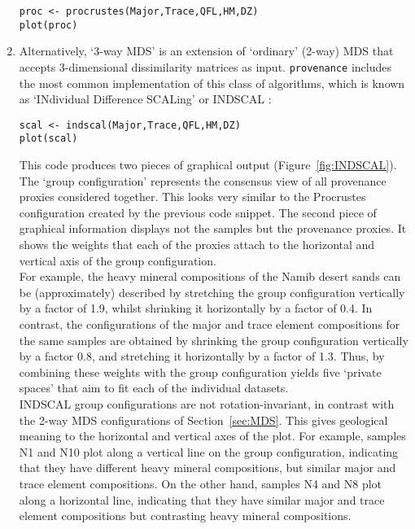 \documentclass[11pt]{article}
\begin{document}
\begin{enumerate}
\begin{verbatim}
proc <- procrustes(Major,Trace,QFL,HM,DZ)
plot(proc)
\end{verbatim}

\item Alternatively, `3-way MDS' is an extension of `ordinary' (2-way)
  MDS that accepts 3-dimensional dissimilarity matrices as
  input. \texttt{provenance} includes the most common implementation
  of this class of algorithms, which is known as `INdividual
  Difference SCALing' or INDSCAL \citep{carroll1970, deleeuw2009}:

\begin{verbatim}
scal <- indscal(Major,Trace,QFL,HM,DZ)
plot(scal)
\end{verbatim}

This code produces two pieces of graphical output
(Figure~\ref{fig:INDSCAL}). The `group configuration' represents the
consensus view of all provenance proxies considered together.  This
looks very similar to the Procrustes configuration created by the
previous code snippet. The second piece of graphical information
displays not the samples but the provenance proxies. It shows the
weights that each of the proxies attach to the horizontal and vertical
axis of the group configuration.\\

For example, the heavy mineral compositions of the Namib desert sands
can be (approximately) described by stretching the group configuration
vertically by a factor of 1.9, whilst shrinking it horizontally by a
factor of 0.4. In contrast, the configurations of the major and trace
element compositions for the same samples are obtained by shrinking
the group configuration vertically by a factor 0.8, and stretching it
horizontally by a factor of 1.3. Thus, by combining these weights with
the group configuration yields five `private spaces' that aim to fit
each of the individual datasets.\\

INDSCAL group configurations are not rotation-invariant, in contrast
with the 2-way MDS configurations of Section~\ref{sec:MDS}. This gives
geological meaning to the horizontal and vertical axes of the plot.
For example, samples N1 and N10 plot along a vertical line on the
group configuration, indicating that they have different heavy mineral
compositions, but similar major and trace element compositions.  On
the other hand, samples N4 and N8 plot along a horizontal line,
indicating that they have similar major and trace element compositions
but contrasting heavy mineral compositions.\\


\end{enumerate}
\end{document}
